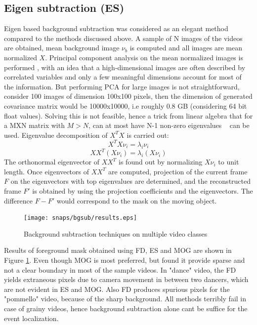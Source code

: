 \subsection{Eigen subtraction (ES)}
Eigen based background subtraction was considered as an elegant method compared to the methods discussed above. A sample of N images of the videos are obtained, mean background image $\nu_b$ is computed and all images are mean normalized  $X$. Principal component analysis on the mean normalized images is performed , with an idea that a high-dimensional images are often described by correlated variables and only a few meaningful dimensions account for most of the information. But performing PCA for large images is not straightforward, consider 100 images of dimension 100x100 pixels, then the dimension of generated covariance matrix would be 10000x10000, i.e roughly 0.8 GB (considering 64 bit float values). Solving this is not feasible, hence a trick from linear algebra that for a MXN matrix with $M>N$, can at most have N-1 non-zero eigenvalues ~\cite{Duda01} can be used. Eigenvalue decomposition of $X^TX$ is carried out:
$$X^TX\nu_i=\lambda_i\nu_i$$
$$XX^T(X\nu_i)=\lambda_i(X\nu_i)$$
The orthonormal eigenvector of $XX^T$ is found out by normalizing $X\nu_i$ to unit length. Once eigenvectors of $XX^T$  are computed, projection of the current frame $F$ on the eigenvectors with top eigenvalues are determined, and the reconstructed frame $F'$ is obtained by using the projection coefficients and the eigenvectors. The difference $F-F'$ would correspond to the mask on the moving object. 

\begin{figure}[htpb]
   \begin{center}
	    \texttt{[image: snaps/bgsub/results.eps]}     
     \caption {Background subtraction techniques on multiple video classes}
   \label{fig:bgsub}
   \end{center}
 \end{figure}
\par Results of foreground mask obtained using FD, ES and MOG are shown in Figure \ref{fig:bgsub}. Even though MOG is most preferred, but found it provide sparse and not a clear boundary in most of the sample videos. In "dance" video, the FD yields extraneous pixels due to camera movement in between two dancers, which are not evident in ES and MOG. Also FD produces spurious pixels for the "pommello" video, because of the sharp background. All methods terribly fail in case of grainy videos, hence background subtraction alone cant be suffice for the event localization.

